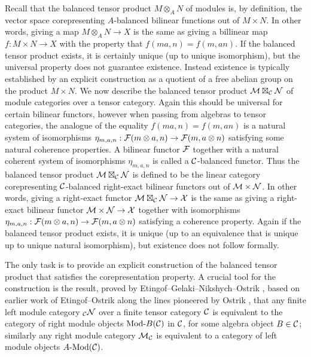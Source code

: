 \documentclass{amsart}
\begin{document}
Recall that the balanced tensor product $M \otimes_A N$ of modules is, by definition, the vector space corepresenting $A$-balanced bilinear functions out of $M \times N$.  In other words, giving a map $M \otimes_A N \rightarrow X$ is the same as giving a billinear map $f: M \times N \rightarrow X$ with the property that $f(ma,n) = f(m, an)$.  If the balanced tensor product exists, it is certainly unique (up to unique isomorphism), but the universal property does not guarantee existence.  Instead existence is typically established by an explicit construction as a quotient of a free abelian group on the product $M \times N$. We now describe the balanced tensor product $\mathcal M \boxtimes_{\mathcal C} \mathcal N$ of module categories over a tensor category.  Again this should be universal for certain bilinear functors, however when passing from algebras to tensor categories, the analogue of the equality $f(ma,n) = f(m, an)$ is a natural system of isomorphisms $\eta_{m,a,n}: \mathcal F(m \otimes a,n) \rightarrow \mathcal F(m, a \otimes n)$ satisfying some natural coherence properties.  A bilinear functor $\mathcal F$ together with a natural coherent system of isomorphisms $\eta_{m,a,n}$ is called a $\mathcal C$-balanced functor.  Thus the balanced tensor product $\mathcal M \boxtimes_{\mathcal C} \mathcal N$ is defined to be the linear category corepresenting $\mathcal C$-balanced right-exact bilinear functors out of $\mathcal M \times \mathcal N$. In other words, giving a right-exact functor $\mathcal M \boxtimes_{\mathcal C} \mathcal N \rightarrow \mathcal X$ is the same as giving a right-exact bilinear functor $\mathcal M \times \mathcal N \rightarrow \mathcal X$ together with isomorphisms $\eta_{m,a,n}: \mathcal F(m \otimes a,n) \rightarrow \mathcal F(m, a \otimes n)$ satisfying a coherence property.  Again if the balanced tensor product exists, it is unique (up to an equivalence that is unique up to unique natural isomorphism), but existence does not follow formally. 

The only task is to provide an explicit construction of the balanced tensor product that satisfies the corepresentation property.  A crucial tool for the construction is the result, proved by Etingof--Gelaki--Nikshych--Ostrik \cite[Thm 2.11.6]{EGNO}, based on earlier work of Etingof--Ostrik \cite[\S 3.2]{EO-ftc} along the lines pioneered by Ostrik \cite[Thm 1]{MR1976459}, that any finite left module category ${}_{\mathcal C} \mathcal N$ over a finite tensor category $\mathcal C$ is equivalent to the category of right module objects $\Mod{}{B}(\cC)$ in $\mathcal C$, for some algebra object $B \in \mathcal C$; similarly any right module category $\mathcal M_{\mathcal C}$ is equivalent to a category of left module objects $\Mod{A}{}(\cC)$.
\end{document}
